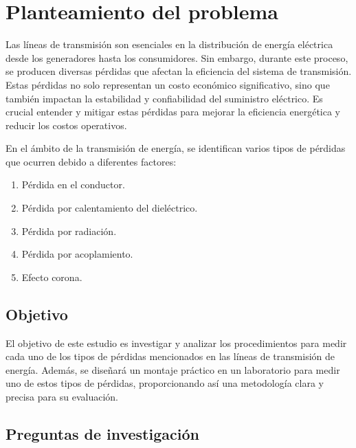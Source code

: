 \section{Planteamiento del problema}

    Las líneas de transmisión son esenciales en la distribución de energía eléctrica desde los generadores hasta los consumidores. Sin embargo, durante este proceso, se producen diversas pérdidas que afectan la eficiencia del sistema de transmisión. Estas pérdidas no solo representan un costo económico significativo, sino que también impactan la estabilidad y confiabilidad del suministro eléctrico. Es crucial entender y mitigar estas pérdidas para mejorar la eficiencia energética y reducir los costos operativos.
    
    En el ámbito de la transmisión de energía, se identifican varios tipos de pérdidas que ocurren debido a diferentes factores:

    \begin{enumerate}
        \item Pérdida en el conductor.

        \item Pérdida por calentamiento del dieléctrico.

        \item Pérdida por radiación.

        \item Pérdida por acoplamiento.

        \item Efecto corona.
    \end{enumerate}

    \subsection{Objetivo}
    
        El objetivo de este estudio es investigar y analizar los procedimientos para medir cada uno de los tipos de pérdidas mencionados en las líneas de transmisión de energía. Además, se diseñará un montaje práctico en un laboratorio para medir uno de estos tipos de pérdidas, proporcionando así una metodología clara y precisa para su evaluación.

    \subsection{Preguntas de investigación}
    
